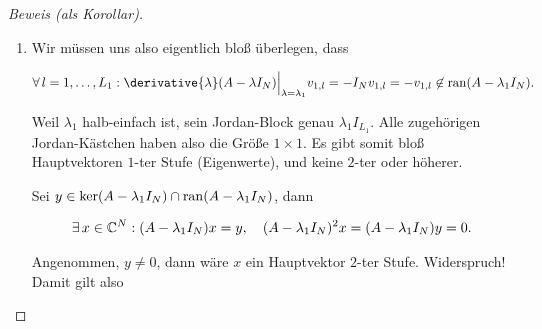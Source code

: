 \begin{proof}[Beweis (als Korollar)]
\begin{enumerate}[label = \arabic*.]
\begin{comment}
            \begin{align*}
                \implies
                (A \hat v_1, \dots, A \hat v_{L_1}, \ast)
                =
                A T
                \stackrel
                {
                    \text{JNF}
                }{=}
                T J
                =
                (\hat v_1, \dots, \hat v_{L_1}, \ast)
                \underbrace
                {
                    \begin{pmatrix}
                        J_1 & 0 \\
                        0   & \ast
                    \end{pmatrix}
                }_J
                =
                (\lambda_1 \hat v_1, \dots, \lambda_1 \hat v_{L_1}, \ast)
            \end{align*}
        
            Wir können die linear unabhängig $\hat v_1, \dots, v_{L_1}$ also orthonormalisieren (Gram-Schmidt) und erhalten die Orthonormalbasis $V_1 := (v_{1, 1}, \dots, v_{1, L_1})$.

        \end{comment}

        \item Wir müssen uns also eigentlich bloß überlegen, dass

        \begin{align*}
            \Forall l = 1, \dots, L_1:
                \derivative{\lambda} (A - \lambda I_N) \Big |_{\lambda = \lambda_1} v_{1, l}
                =
                -I_N v_{1, l}
                =
                -v_{1, l}
                \not \in
                \ran (A - \lambda_1 I_N).
        \end{align*}

        Weil $\lambda_1$ halb-einfach ist, sein Jordan-Block genau $\lambda_1 I_{L_1}$.
        Alle zugehörigen Jordan-Kästchen haben also die Größe $1 \times 1$.
        Es gibt somit bloß Hauptvektoren $1$-ter Stufe (Eigenwerte), und keine $2$-ter oder höherer.

        Sei $y \in \ker (A - \lambda_1 I_N) \cap \operatorname{ran} (A - \lambda_1 I_N)$, dann

        \begin{align*}
            \exists \, x \in \mathbb{C}^N:
                (A - \lambda_1 I_N) x = y,
                \quad
                (A - \lambda_1 I_N)^2 x = (A - \lambda_1 I_N) y = 0.
        \end{align*}

        Angenommen, $y \neq 0$, dann wäre $x$ ein Hauptvektor $2$-ter Stufe.
        Widerspruch!
        Damit gilt also


\end{enumerate}
\end{proof}
